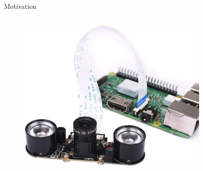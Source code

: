 \begin{frame}{Motivation}
\begin{columns}[T]

        \begin{figure}
            \centering
            \includegraphics[width=0.85\textwidth]{Bilder/raspi_and_cam.jpg}
        \end{figure}
        
    \end{columns}

\end{frame}
